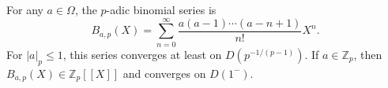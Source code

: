 For any $a \in \Omega$, the $p$-adic binomial series is $$B_{a,p}(X) = \sum_{n=0}^\infty \frac{a(a-1)\cdots(a-n+1)}{n!} X^n.$$ For $|a|_p \leq 1$, this series converges at least on $D(p^{-1/(p-1)})$. If $a \in \mathbb{Z}_p$, then $B_{a,p}(X) \in \mathbb{Z}_p[[X]]$ and converges on $D(1^-)$.